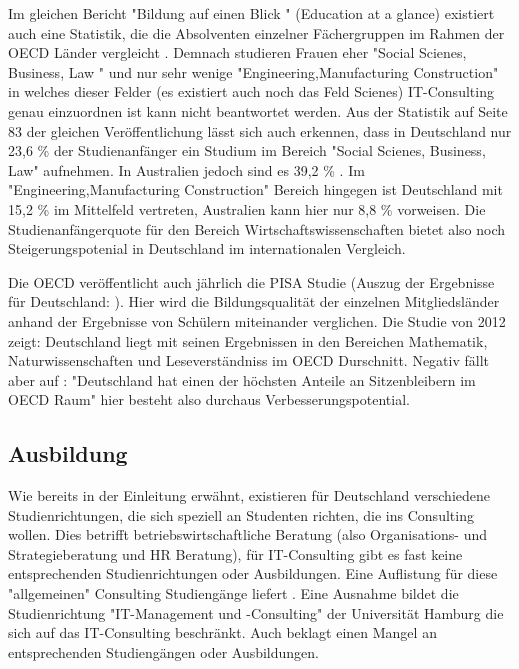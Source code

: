 Im gleichen Bericht "Bildung auf einen Blick " (Education at a glance) existiert auch eine Statistik, die die Absolventen einzelner Fächergruppen im Rahmen der OECD Länder vergleicht \cite{oecd3}. Demnach studieren Frauen eher "Social Scienes, Business, Law " und nur sehr wenige "Engineering,Manufacturing Construction" in welches dieser Felder (es existiert auch noch das Feld Scienes) IT-Consulting genau einzuordnen ist kann nicht beantwortet werden. Aus der Statistik auf Seite 83 der gleichen Veröffentlichung lässt sich auch erkennen, dass in Deutschland nur 23,6 \% der Studienanfänger ein Studium im Bereich "Social Scienes, Business, Law" aufnehmen. In Australien jedoch sind es 39,2 \% . Im "Engineering,Manufacturing Construction" Bereich hingegen ist Deutschland mit 15,2 \% im Mittelfeld vertreten, Australien kann hier nur  8,8 \% vorweisen. Die Studienanfängerquote für den Bereich Wirtschaftswissenschaften bietet also noch Steigerungspotenial in Deutschland im internationalen Vergleich.

Die OECD veröffentlicht auch jährlich die PISA Studie (Auszug der Ergebnisse für Deutschland: \cite{pisa} ). Hier wird die Bildungsqualität der einzelnen Mitgliedsländer anhand der Ergebnisse von Schülern miteinander verglichen. Die Studie von 2012 zeigt: Deutschland liegt mit seinen Ergebnissen in den Bereichen Mathematik, Naturwissenschaften und Leseverständniss im OECD Durschnitt. Negativ fällt aber auf : "Deutschland hat einen der höchsten Anteile an Sitzenbleibern im OECD Raum" hier besteht also durchaus Verbesserungspotential.

\subsection{Ausbildung}
Wie bereits in der Einleitung erwähnt, existieren für Deutschland verschiedene Studienrichtungen, die sich speziell an Studenten richten, die ins Consulting wollen. Dies betrifft betriebswirtschaftliche Beratung (also Organisations- und Strategieberatung und HR Beratung), für IT-Consulting gibt es fast keine entsprechenden Studienrichtungen oder Ausbildungen.
Eine Auflistung für diese "allgemeinen" Consulting Studiengänge liefert \cite{NissenKlaukDeelmannMohe201209} . 
Eine Ausnahme bildet die Studienrichtung "IT-Management und -Consulting" der Universität Hamburg die sich auf das IT-Consulting beschränkt. Auch \cite{IDSScheer} beklagt einen Mangel an entsprechenden Studiengängen oder Ausbildungen.

